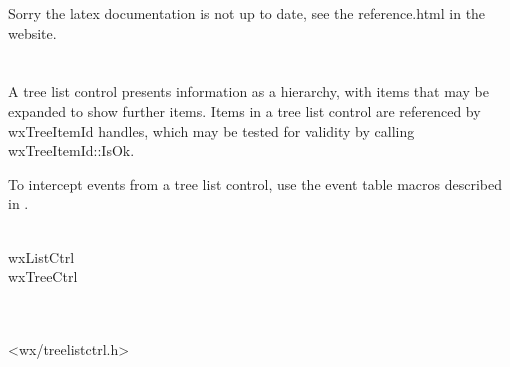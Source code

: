 
Sorry the latex documentation is not up to date, see the reference.html in the website.

\section{}\label{wxtreelistctrl}

A tree list control presents information as a hierarchy, with items that may be expanded
to show further items. Items in a tree list control are referenced by wxTreeItemId handles,
which may be tested for validity by calling wxTreeItemId::IsOk.

To intercept events from a tree list control, use the event table macros described in .


\\
wxListCtrl\\
wxTreeCtrl\\
\\
\\


<wx/treelistctrl.h>


